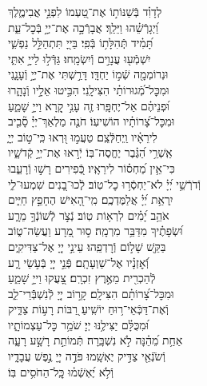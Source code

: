 \documentclass[twoside, openany, parskip=half, 11pt]{book}
\begin{document}
\begin{narrow}
לְדָוִ֗ד \hfill
בְּֿשַׁנּוֹת֣וֹ אֶת־טַ֭עְמוֹ לִפְנֵ֣י אֲבִימֶ֑לֶךְ\\ וַ֝יְגָרְֿשֵׁ֗הוּ וַיֵּלַֽךְ׃ \hfill
 אֲבָרְֿכָ֣ה אֶת־יְיָ֣ בְּֿכׇל־עֵ֑ת \\ תָּ֝מִ֗יד תְּֽֿהִלָּת֥וֹ בְּֿפִֽי׃ \hfill
 בַּייָ֭ תִּתְהַלֵּ֣ל נַפְשִׁ֑י\\ יִשְׁמְֿע֖וּ עֲנָוִ֣ים וְֿיִשְׂמָֽחוּ׃ \hfill
 גַּדְּֿל֣וּ לַייָ֣ אִתִּ֑י\\ וּנְרוֹמְמָ֖ה שְֿׁמ֣וֹ יַחְדָּֽו׃ \hfill
 דָּרַ֣שְׁתִּי אֶת־יְיָ֣ וְֿעָנָ֑נִי\\ וּמִכׇּל־מְֿ֝גוּרוֹתַ֗י הִצִּילָֽנִי׃ \hfill
 הִבִּ֣יטוּ אֵלָ֣יו וְֿנָהָ֑רוּ\\ וּ֝פְנֵיהֶ֗ם אַל־יֶחְפָּֽרוּ׃ \hfill
 זֶ֤ה עָנִ֣י קָ֭רָא וַייָ֣ שָׁמֵ֑עַ\\ וּמִכׇּל־צָ֝רוֹתָ֗יו הוֹשִׁיעֽוֹ׃ \hfill
 חֹנֶ֤ה מַלְאַךְ־יְיָ֓ סָ֘בִ֤יב\\ לִירֵאָ֗יו וַֽיְחַלְּֿצֵֽם׃ \hfill
 טַעֲמ֣וּ וּ֭רְאוּ כִּֽי־ט֣וֹב יְיָ֑\\ אַֽשְׁרֵ֥י הַ֝גֶּ֗בֶר יֶחֱסֶה־בּֽוֹ׃ \hfill
 יְֿר֣אוּ אֶת־יְיָ֣ קְֿדֹשָׁ֑יו\\ כִּי־אֵ֥ין מַ֝חְס֗וֹר לִירֵאָֽיו׃ \hfill
 כְּֿ֭פִירִים רָשׁ֣וּ וְֿרָעֵ֑בוּ\\ וְֿדֹרְֿשֵׁ֥י יְ֝יָ֗ לֹא־יַחְסְֿר֥וּ כׇל־טֽוֹב׃ \hfill
 לְֽֿכוּ־בָ֭נִים שִׁמְעוּ־לִ֑י\\ יִֽרְאַ֥ת יְ֝יָ֗ אֲלַמֶּדְכֶֽם׃ \hfill
 מִֽי־הָ֭אִישׁ הֶחָפֵ֣ץ חַיִּ֑ים\\ אֹהֵ֥ב יָ֝מִ֗ים לִרְא֥וֹת טֽוֹב׃ \hfill
 נְֿצֹ֣ר לְֿשׁוֹנְֿךָ֣ מֵרָ֑ע\\ וּ֝שְׂפָתֶ֗יךָ מִדַּבֵּ֥ר מִרְמָֽה׃ \hfill
 ס֣וּר מֵ֭רָע וַעֲשֵׂה־ט֑וֹב\\ בַּקֵּ֖שׁ שָׁל֣וֹם וְֿרׇדְפֵֽהוּ׃ \hfill
 עֵינֵ֣י יְיָ֭ אֶל־צַדִּיקִ֑ים\\ וְֿ֝אׇזְנָ֗יו אֶל־שַׁוְעָתָֽם׃ \hfill
 פְּֿנֵ֣י יְיָ֭ בְּֿעֹ֣שֵׂי רָ֑ע\\ לְֿהַכְרִ֖ית מֵאֶ֣רֶץ זִכְרָֽם׃ \hfill
 צָ֭עֲקוּ וַייָ֣ שָׁמֵ֑עַ\\ וּמִכׇּל־צָ֝רוֹתָ֗ם הִצִּילָֽם׃ \hfill
 קָר֣וֹב יְיָ֭ לְֿנִשְׁבְּֿֿרֵי־לֵ֑ב\\ וְֽֿאֶת־דַּכְּֿאֵי־ר֥וּחַ יוֹשִֽׁיעַ׃ \hfill
 רַ֭בּוֹת רָע֣וֹת צַדִּ֑יק\\ וּ֝מִכֻּלָּ֗ם יַצִּילֶ֥נּוּ יְיָ׃ \hfill
 שֹׁמֵ֥ר כׇּל־עַצְמוֹתָ֑יו\\ אַחַ֥ת מֵ֝הֵ֗נָּה לֹ֣א נִשְׁבָּֽרָה׃ \hfill
 תְּֿמוֹתֵ֣ת רָשָׁ֣ע רָעָ֑ה\\ וְֿשֹׂנְֿאֵ֖י צַדִּ֣יק יֶאְשָֽׁמוּ׃ \hfill
 פֹּדֶ֣ה יְיָ֭ נֶ֣פֶשׁ עֲבָדָ֑יו\\ וְֿלֹ֥א יֶ֝אְשְֿׁמ֗וּ \hfill כׇּֽל־הַחֹסִ֥ים בּֽוֹ׃ \\




\end{narrow}
\end{document}
